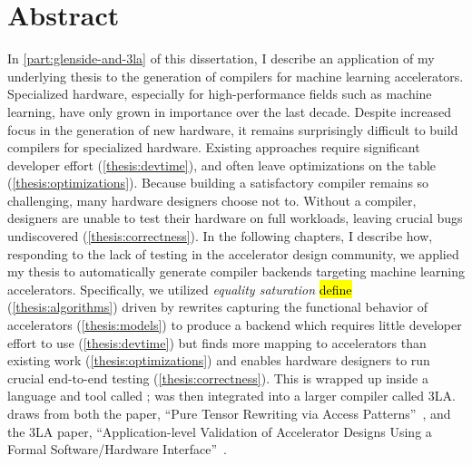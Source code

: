 \chapter*{ Abstract}

In \cref{part:glenside-and-3la} of this dissertation,
  I describe an application of my underlying thesis
  to the generation of compilers
  for machine learning accelerators.
Specialized hardware, especially for high-performance fields
  such as machine learning,
  have only grown in importance
  over the last decade.
Despite increased focus
  in the generation of new hardware,
  it remains surprisingly difficult
  to build compilers for specialized hardware.
Existing approaches
  require significant
  developer effort (\cref{thesis:devtime}),
  and 
  often leave
  optimizations on the table (\cref{thesis:optimizations}).
Because building a satisfactory compiler
  remains so challenging,
  many hardware designers choose not to.
Without a compiler,
  designers are unable to test
  their hardware on full workloads,
  leaving crucial bugs undiscovered
  (\cref{thesis:correctness}).
In the following chapters,
  I describe how,
  responding to the lack of testing
  in the accelerator design
  community,
  we applied
  my thesis
  to automatically generate compiler backends
  targeting machine learning accelerators.
Specifically, we utilized
  \textit{equality saturation} \hl{define}
  (\cref{thesis:algorithms})
  driven by rewrites capturing
  the functional behavior of accelerators
  (\cref{thesis:models})
  to produce a backend
  which 
  requires little developer effort to use
  (\cref{thesis:devtime})
  but finds more mapping to accelerators
  than existing work
  (\cref{thesis:optimizations})
  and enables hardware designers to run
  crucial end-to-end testing
  (\cref{thesis:correctness}).
This is wrapped up inside a language and tool called
  \g;
  \g was then integrated into a larger compiler
  called 3LA.
 draws from both the 
  \g paper,
  ``Pure Tensor Rewriting via Access Patterns''~\cite{smith2021pure},
  and the 
  3LA paper,
  ``Application-level Validation of Accelerator Designs Using a Formal Software/Hardware Interface''~\cite{huang2024application}.
